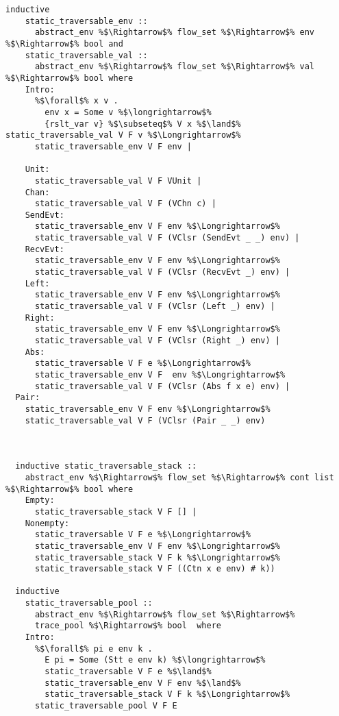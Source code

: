 \documentclass{article}
\begin{document}
\begin{lstlisting}[style=codestyle1, escapechar=\%]
  inductive 
    static_traversable_env ::
      abstract_env %$\Rightarrow$% flow_set %$\Rightarrow$% env %$\Rightarrow$% bool and
    static_traversable_val ::
      abstract_env %$\Rightarrow$% flow_set %$\Rightarrow$% val %$\Rightarrow$% bool where
    Intro:
      %$\forall$% x v .
        env x = Some v %$\longrightarrow$%
        {rslt_var v} %$\subseteq$% V x %$\land$% static_traversable_val V F v %$\Longrightarrow$%
      static_traversable_env V F env |

    Unit:
      static_traversable_val V F VUnit |
    Chan:
      static_traversable_val V F (VChn c) |
    SendEvt:
      static_traversable_env V F env %$\Longrightarrow$%
      static_traversable_val V F (VClsr (SendEvt _ _) env) |
    RecvEvt:
      static_traversable_env V F env %$\Longrightarrow$%
      static_traversable_val V F (VClsr (RecvEvt _) env) |
    Left:
      static_traversable_env V F env %$\Longrightarrow$%
      static_traversable_val V F (VClsr (Left _) env) |
    Right:
      static_traversable_env V F env %$\Longrightarrow$%
      static_traversable_val V F (VClsr (Right _) env) |
    Abs:
      static_traversable V F e %$\Longrightarrow$% 
      static_traversable_env V F  env %$\Longrightarrow$%
      static_traversable_val V F (VClsr (Abs f x e) env) |
  Pair:
    static_traversable_env V F env %$\Longrightarrow$%
    static_traversable_val V F (VClsr (Pair _ _) env) 



  inductive static_traversable_stack ::
    abstract_env %$\Rightarrow$% flow_set %$\Rightarrow$% cont list %$\Rightarrow$% bool where
    Empty:
      static_traversable_stack V F [] |
    Nonempty:
      static_traversable V F e %$\Longrightarrow$%
      static_traversable_env V F env %$\Longrightarrow$%
      static_traversable_stack V F k %$\Longrightarrow$% 
      static_traversable_stack V F ((Ctn x e env) # k))

  inductive
    static_traversable_pool ::
      abstract_env %$\Rightarrow$% flow_set %$\Rightarrow$%
      trace_pool %$\Rightarrow$% bool  where
    Intro:
      %$\forall$% pi e env k .
        E pi = Some (Stt e env k) %$\longrightarrow$% 
        static_traversable V F e %$\land$%
        static_traversable_env V F env %$\land$%
        static_traversable_stack V F k %$\Longrightarrow$% 
      static_traversable_pool V F E

  \end{lstlisting}
\end{document}
